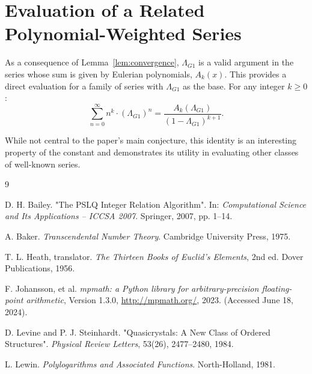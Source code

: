 \documentclass{amsart}
\theoremstyle{plain}
\theoremstyle{definition}
\theoremstyle{remark}
\newcommand{\LambdaG}{\Lambda_{G1}}
\begin{document}
\section{Evaluation of a Related Polynomial-Weighted Series}
As a consequence of Lemma~\ref{lem:convergence}, $\LambdaG$ is a valid argument in the series whose sum is given by Eulerian polynomials, $A_k(x)$. This provides a direct evaluation for a family of series with $\LambdaG$ as the base. For any integer $k \ge 0$:
\[ \sum_{n=0}^{\infty} n^k \cdot (\LambdaG)^n = \frac{A_k(\LambdaG)}{(1-\LambdaG)^{k+1}}. \]

While not central to the paper's main conjecture, this identity is an interesting property of the constant and demonstrates its utility in evaluating other classes of well-known series.

\begin{thebibliography}{9}

D. H. Bailey. "The PSLQ Integer Relation Algorithm". In: \textit{Computational Science and Its Applications -- ICCSA 2007}. Springer, 2007, pp. 1--14.

A. Baker. \textit{Transcendental Number Theory}. Cambridge University Press, 1975. 

T. L. Heath, translator. \textit{The Thirteen Books of Euclid's Elements}, 2nd ed. Dover Publications, 1956. 

F. Johansson, et al. \textit{mpmath: a Python library for arbitrary-precision floating-point arithmetic}, Version 1.3.0, \url{http://mpmath.org/}, 2023. (Accessed June 18, 2024). 

D. Levine and P. J. Steinhardt. "Quasicrystals: A New Class of Ordered Structures". \textit{Physical Review Letters}, 53(26), 2477--2480, 1984. 

L. Lewin. \textit{Polylogarithms and Associated Functions}. North-Holland, 1981.

\end{thebibliography}
\end{document}
